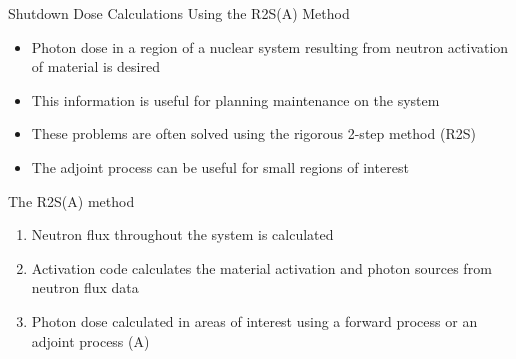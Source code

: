 \documentclass{beamer}
\begin{document}
\begin{frame}{Shutdown Dose Calculations Using the R2S(A) Method}

  \begin{itemize}
    \item Photon dose in a region of a nuclear system resulting from neutron 
      activation of material is desired
      \medskip
    \item This information is useful for planning maintenance on the system
      \medskip
    \item These problems are often solved using the rigorous 2-step method (R2S)
      \medskip
    \item The adjoint process can be useful for small regions of interest
  \end{itemize}

  \medskip
  \medskip

  \begin{beamerboxesrounded}[upper=boxheadcolor,lower=boxbodycolor,shadow=true]
    {The R2S(A) method}
    \begin{enumerate}
      \item Neutron flux throughout the system is calculated
        \smallskip
      \item Activation code calculates the material activation and photon
        sources from neutron flux data
        \smallskip
      \item Photon dose calculated in areas of interest using a forward
        process or an adjoint process (A)
    \end{enumerate}
  \end{beamerboxesrounded}

\end{frame}

  
\end{document}
